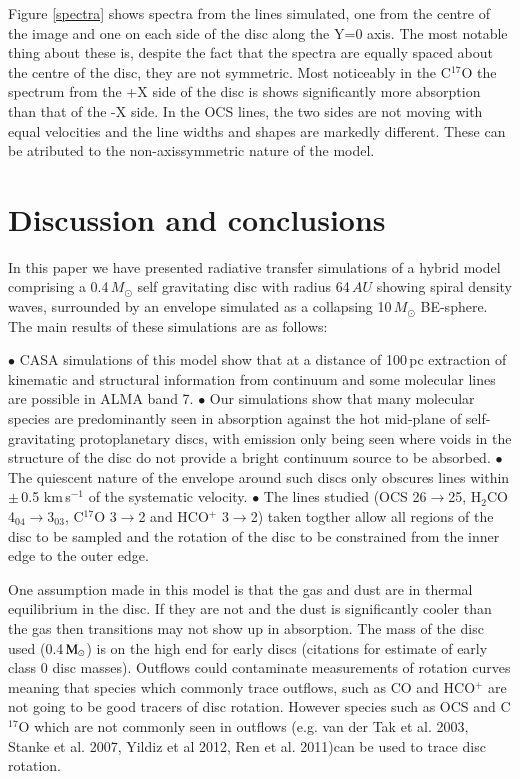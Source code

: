 \documentclass[useAMS,usenatbib]{mn2e}
\begin{document}
Figure \ref{spectra} shows spectra from the lines simulated, one from the centre of the image and one on each side of the disc along the Y=0 axis. The most notable thing about these is, despite the fact that the spectra are equally spaced about the centre of the disc, they are not symmetric. Most noticeably in the C$^{17}$O the spectrum from the +X side of the disc is shows significantly more absorption than that of the -X side. In the OCS lines, the two sides are not moving with equal velocities and the line widths and shapes are markedly different. These can be atributed to the non-axissymmetric nature of the model.

\section{Discussion and conclusions} \label{sec:discussion}

In this paper we have presented radiative transfer simulations of a hybrid model comprising a 0.4$\, M_\odot$ self gravitating disc with radius 64$\,AU$ showing spiral density waves, surrounded by an envelope simulated as a collapsing 10$\,M_\odot$ BE-sphere. The main results of these simulations are as follows:\newline

$\bullet$ CASA simulations of this model show that at a distance of 100$\,$pc extraction of kinematic and structural information from continuum and some molecular lines are possible in ALMA band 7.\newline 
$\bullet$ Our simulations show that many molecular species are predominantly seen in absorption against the hot mid-plane of self-gravitating protoplanetary discs, with emission only being seen where voids in the structure of the disc do not provide a bright continuum source to be absorbed.\newline 
$\bullet$ The quiescent nature of the envelope around such discs only obscures lines within $\pm\,$0.5 km$\,$s$^{-1}$ of the systematic velocity.\newline 
$\bullet$ The lines studied (OCS 26$\rightarrow$25, H$_2$CO 4$_{04}$$\rightarrow$3$_{03}$, C$^{17}$O 3$\rightarrow$2 and HCO$^+$ 3$\rightarrow$2) taken togther allow all regions of the disc to be sampled and the rotation of the disc to be constrained from the inner edge to the outer edge.\newline 


One assumption made in this model is that the gas and dust are in thermal equilibrium in the disc. If they are not and the dust is significantly cooler than the gas then transitions may not show up in absorption.\newline
The mass of the disc used (0.4$\,\rm{M}_\odot$) is on the high end for early discs (citations for estimate of early class 0 disc masses). Outflows could contaminate measurements of rotation curves meaning that species  which commonly trace outflows, such as CO and HCO$^+$ are not going to be good tracers of disc rotation. However species such as OCS and C$^{17}$O which are not commonly seen in outflows (e.g. van der Tak et al. 2003, Stanke et al. 2007, Yildiz et al 2012, Ren et al. 2011)can be used to trace disc rotation.\newline
\end{document}
